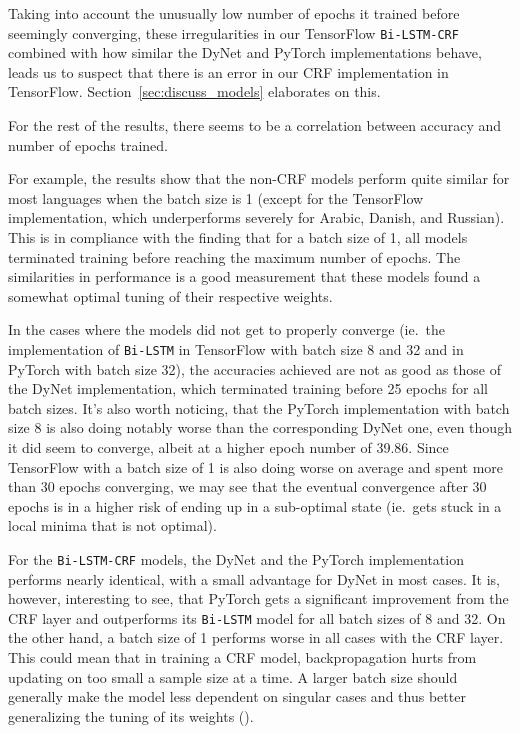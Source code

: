 Taking into account the unusually low number of epochs it trained before
seemingly converging, these irregularities in our TensorFlow
\texttt{Bi-LSTM-CRF} combined with how similar the DyNet and PyTorch
implementations behave, leads us to suspect that there is an error in our CRF
implementation in TensorFlow. Section~\ref{sec:discuss_models} elaborates on this.

For the rest of the results, there seems to be a correlation between accuracy and
number of epochs trained.

For example, the results show that the non-CRF models perform quite similar for
most languages when the batch size is 1 (except for the TensorFlow
implementation, which underperforms severely for Arabic, Danish, and Russian).
This is in compliance with the finding that for a batch size of 1, all models
terminated training before reaching the maximum number of epochs. The
similarities in performance is a good measurement that these models found a
somewhat optimal tuning of their respective weights.

In the cases where the models did not get to properly converge (ie.\ the
implementation of \texttt{Bi-LSTM} in TensorFlow with batch size 8 and 32 and in
PyTorch with batch size 32), the accuracies achieved are not as good as those of
the DyNet implementation, which terminated training before 25 epochs for
all batch sizes. It's also worth noticing, that the PyTorch implementation with
batch size 8 is also doing notably worse than the corresponding DyNet one, even
though it did seem to converge, albeit at a higher epoch number of 39.86. Since
TensorFlow with a batch size of 1 is also doing worse on average and spent more
than 30 epochs converging, we may see that the eventual convergence after 30
epochs is in a higher risk of ending up in a sub-optimal state (ie.\ gets stuck in
a local minima that is not optimal).

For the \texttt{Bi-LSTM-CRF} models, the DyNet and the PyTorch implementation
performs nearly identical, with a small advantage for DyNet in most cases. It is,
however, interesting to see, that PyTorch gets a significant improvement from the
CRF layer and outperforms its \texttt{Bi-LSTM} model for all batch sizes of 8
and 32. On the other hand, a batch size of 1 performs worse in all cases with
the CRF layer. This could mean that in training a CRF model, backpropagation
hurts from updating on too small a sample size at a time. A larger batch size
should generally make the model less dependent on singular cases and thus better
generalizing the tuning of its weights (\cite{falcon2018lstms}).

